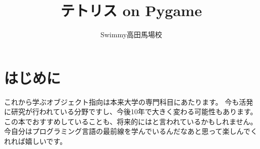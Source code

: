 \documentclass[12pt, a4paper, uplatex]{jsbook}
\title{テトリス on Pygame}
\author{Swimmy高田馬場校}
\begin{document}
\maketitle
\tableofcontents
\chapter{はじめに}
これから学ぶオブジェクト指向は本来大学の専門科目にあたります。
今も活発に研究が行われている分野ですし、今後10年で大きく変わる可能性もあります。
この本でおすすめしていることも、将来的にはと言われているかもしれません。
今自分はプログラミング言語の最前線を学んでいるんだなあと思って楽しんでくれれば嬉しいです。






















\end{document}
